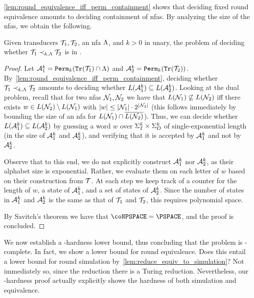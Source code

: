 \autoref{lem:round_equivalence_iff_perm_containment} shows that deciding fixed round equivalence amounts to deciding containment of \glspl{nfa}. By analyzing the size of the \glspl{nfa}, we obtain the following.
\begin{theorem}
	\label{thm:fixed_re_PSPACE}
	Given transducers $\mathcal{T}_1,\mathcal{T}_2$, an \gls{nfa} $\Lambda$, and $k>0$ in unary, the problem of deciding whether $\mathcal{T}_1\prec_{k,\Lambda}\mathcal{T}_2$ is in \PSPACE.
\end{theorem}
\begin{proof}
	Let $\mathcal{A}_1^k={\mathtt{Perm}}_k({\mathtt{Tr}}(\mathcal{T}_1)\cap \Lambda)$ and $\mathcal{A}_2^k={\mathtt{Perm}}_k({\mathtt{Tr}}(\mathcal{T}_2))$. By~\cref{lem:round_equivalence_iff_perm_containment}, deciding whether $\mathcal{T}_1\prec_{k,\Lambda} \mathcal{T}_2$ amounts to deciding whether $L(\mathcal{A}^k_1)\subseteq L(\mathcal{A}^k_2)$. Looking at the dual problem, recall that for two \glspl{nfa} $\mathcal{N}_1, \mathcal{N}_2$ we have that $L(\mathcal{N}_1)\not\subseteq L(\mathcal{N}_2)$ iff 
	there exists $w\in L(\mathcal{N}_2)\setminus L(\mathcal{N}_1)$ with $|w|\le |\mathcal{N}_1|\cdot 2^{|\mathcal{N}_2|}$ (this follows immediately by bounding the size of an \gls{nfa} for $L(\mathcal{N}_1)\cap \overline{L(\mathcal{N}_2)}$). Thus, we can decide whether $L(\mathcal{A}^k_1)\subseteq L(\mathcal{A}^k_2)$ by guessing a word $w$ over $\Sigma_{I}^k\times \Sigma_{O}^k$ of single-exponential length (in the size of $\mathcal{A}^k_1$ and $\mathcal{A}^k_2$), and verifying that it is accepted by $\mathcal{A}^k_1$ and not by $\mathcal{A}^k_2$. 
	
	Observe that to this end, we do not explicitly construct $\mathcal{A}^k_1$ nor $\mathcal{A}^k_2$, as their alphabet size is exponential. Rather, we evaluate them on each letter of $w$ based on their construction from $\mathcal{T}$. At each step we keep track of a counter for the length of $w$, a state of $\mathcal{A}^k_1$, and a set of states of $\mathcal{A}^k_2$. Since the number of states in $\mathcal{A}^k_1$ and $\mathcal{A}^k_2$ is the same as that of $\mathcal{T}_1$ and $\mathcal{T}_2$, this requires polynomial space.
	
	By Savitch's theorem we have that $\coNPSPACE=\PSPACE$, and the proof is concluded.
\end{proof}

We now establish a \PSPACE-hardness lower bound, thus concluding that the problem is \PSPACE-complete. In fact, we show a lower bound for round equivalence. Does this entail a lower bound for round simulation by~\cref{lem:reduce_equiv_to_simulation}? Not immediately so, since the reduction there is a Turing reduction. Nevertheless, our \PSPACE-hardness proof actually explicitly shows the hardness of both simulation and equivalence.

